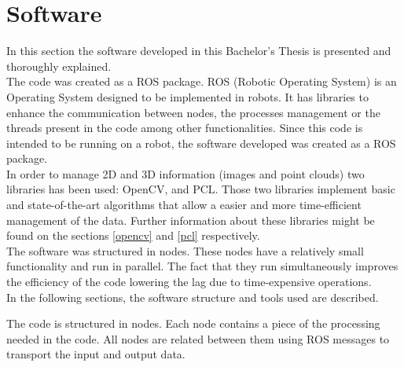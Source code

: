 \chapter{Software}
\label{software}
In this section the software developed in this Bachelor's Thesis is presented and thoroughly explained. 
\\

The code was created as a ROS package. ROS (Robotic Operating System) is an Operating System designed to be implemented in robots. It has libraries to enhance the communication between nodes, the processes management or the threads present in the code among other functionalities. 
Since this code is intended to be running on a robot, the software developed was created as a ROS package. 
\\

In order to manage 2D and 3D information (images and point clouds) two libraries has been used: OpenCV, and PCL. Those two libraries implement basic and state-of-the-art algorithms that allow a easier and more time-efficient management of the data. Further information about these libraries might be found on the sections \ref{opencv} and \ref{pcl} respectively. 
\\

The software was structured in nodes. These nodes have a relatively small functionality and run in parallel. The fact that they run simultaneously improves the efficiency of the code lowering the lag due to time-expensive operations. 
\\

In the following sections, the software structure and tools used are described. 





The code is structured in nodes. Each node contains a piece of the processing needed in the code. All nodes are related between them using ROS messages to transport the input and output data. 
\\

